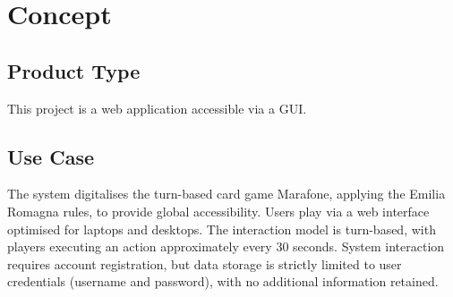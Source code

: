 \documentclass{scrartcl}
\begin{document}
%
%
%
%
%
%
%
%
%
%
%
%
%

\section{Concept}\label{concept}

\subsection*{Product Type}
This project is a web application accessible via a GUI.

\subsection*{Use Case}
The system digitalises the turn-based card game Marafone, applying the Emilia Romagna rules, to provide global accessibility. Users play via a web interface optimised for laptops and desktops. The interaction model is turn-based, with players executing an action approximately every 30 seconds. System interaction requires account registration, but data storage is strictly limited to user credentials (username and password), with no additional information retained.
\end{document}
